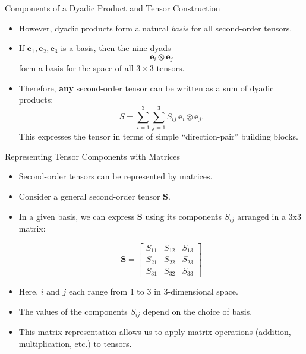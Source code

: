 \documentclass{beamer}
\begin{document}
\begin{frame}{Components of a Dyadic Product and Tensor Construction}

\begin{itemize}
    \item However, dyadic products form a natural \emph{basis} for all
          second-order tensors.

    \item If $\mathbf{e}_1,\mathbf{e}_2,\mathbf{e}_3$ is a basis, then the nine
          dyads
          \[
              \mathbf{e}_i \otimes \mathbf{e}_j
          \]
          form a basis for the space of all $3\times 3$ tensors.

    \item Therefore, \textbf{any} second-order tensor can be written as a sum of
          dyadic products:
          \[
              S = \sum_{i=1}^{3} \sum_{j=1}^{3} S_{ij}\,
                  \mathbf{e}_i \otimes \mathbf{e}_j.
          \]
          This expresses the tensor in terms of simple “direction-pair”
          building blocks.

\end{itemize}

\end{frame}


\begin{frame}{Representing Tensor Components with Matrices}
    \begin{itemize}
        \item   Second-order tensors can be represented by matrices.

        \item   Consider a general second-order tensor \( \mathbf{S} \).

        \item   In a given basis, we can express \(\mathbf{S}\) using its components \(S_{ij}\) arranged in a 3x3 matrix:

            \[
            \mathbf{S} =
            \begin{bmatrix}
                S_{11} & S_{12} & S_{13} \\
                S_{21} & S_{22} & S_{23} \\
                S_{31} & S_{32} & S_{33}
            \end{bmatrix}
            \]

        \item   Here, \(i\) and \(j\) each range from 1 to 3 in 3-dimensional space.

        \item   The values of the components \(S_{ij}\) depend on the choice of basis.

        \item   This matrix representation allows us to apply matrix operations (addition, multiplication, etc.) to tensors.
    \end{itemize}
\end{frame}
\end{document}
